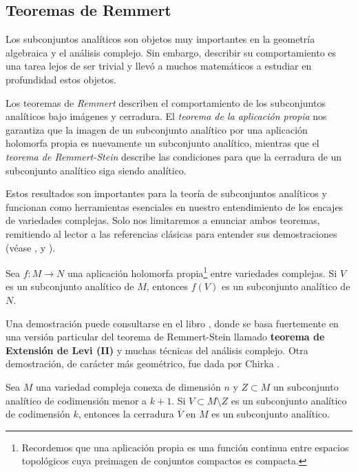     \subsection{Teoremas de Remmert}
		
		Los subconjuntos analíticos son objetos muy importantes en la geometría algebraica y el análisis complejo. Sin embargo, describir su comportamiento es una tarea lejos de ser trivial y llevó a muchos matemáticos a estudiar en profundidad estos objetos.
		
		Los teoremas de \textit{Remmert} describen el comportamiento de los subconjuntos analíticos bajo imágenes y cerradura. El \textit{teorema de la aplicación propia} nos garantiza que la imagen de un subconjunto analítico por una aplicación holomorfa propia es nuevamente un subconjunto analítico, mientras que el \textit{teorema de Remmert-Stein} describe las condiciones para que la cerradura de un subconjunto analítico siga siendo analítico.
		
		Estos resultados son importantes para la teoría de subconjuntos analíticos y funcionan como herramientas esenciales en nuestro entendimiento de los encajes de variedades complejas. Solo nos limitaremos a enunciar ambos teoremas, remitiendo al lector a las referencias clásicas para entender sus demostraciones (véase \parencite{griffiths}, \parencite{lojasiewicz} y \parencite{chirka}). 
		
    	\begin{theorem}\label{aplicacionpropia}
    		Sea $f:M\to N$ una aplicación holomorfa propia\footnote{Recordemos que una aplicación propia es una función continua entre espacios topológicos cuya preimagen de conjuntos compactos es compacta.} entre variedades complejas. Si $V$ es un subconjunto analítico de $M$, entonces $f(V)$ es un subconjunto analítico de $N$.
    	\end{theorem}
    	Una demostración puede consultarse en el libro \parencite[Chap.3~,Sec.2]{griffiths}, donde se basa fuertemente en una versión particular del teorema de Remmert-Stein llamado \textbf{teorema de Extensión de Levi (II)} y muchas técnicas del análisis complejo. Otra demostración, de carácter más geométrico, fue dada por Chirka \parencite[Chap. 4~, Sec.4.4]{chirka}.
    	
		
		\begin{theorem}\label{remmertstein}
			Sea $M$ una variedad compleja conexa de dimensión $n$ y $Z\subset M$ un subconjunto analítico de codimensión menor a $k+1$. Si $V\subset M\setminus Z$ es un subconjunto analítico de codimensión $k$, entonces la cerradura $\overline{V}$ en $M$ es un subconjunto analítico. 
		\end{theorem}
		
